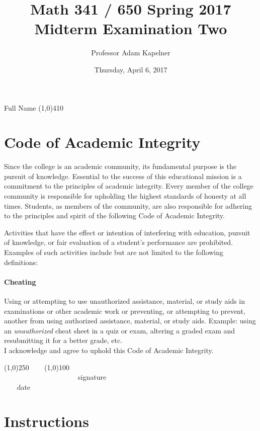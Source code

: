 \documentclass[12pt]{article}
\title{Math 341 / 650 Spring 2017 \\ Midterm Examination Two}
\author{Professor Adam Kapelner}
\date{Thursday, April 6, 2017}
\begin{document}
\maketitle

\noindent Full Name \line(1,0){410}

\thispagestyle{empty}

\section*{Code of Academic Integrity}

\footnotesize
Since the college is an academic community, its fundamental purpose is the pursuit of knowledge. Essential to the success of this educational mission is a commitment to the principles of academic integrity. Every member of the college community is responsible for upholding the highest standards of honesty at all times. Students, as members of the community, are also responsible for adhering to the principles and spirit of the following Code of Academic Integrity.

Activities that have the effect or intention of interfering with education, pursuit of knowledge, or fair evaluation of a student's performance are prohibited. Examples of such activities include but are not limited to the following definitions:

\paragraph{Cheating} Using or attempting to use unauthorized assistance, material, or study aids in examinations or other academic work or preventing, or attempting to prevent, another from using authorized assistance, material, or study aids. Example: using an \emph{unauthorized} cheat sheet in a quiz or exam, altering a graded exam and resubmitting it for a better grade, etc.
\\

\noindent I acknowledge and agree to uphold this Code of Academic Integrity. \\

\begin{center}
\line(1,0){250} ~~~ \line(1,0){100}\\
~~~~~~~~~~~~~~~~~~~~~signature~~~~~~~~~~~~~~~~~~~~~~~~~~~~~~~~~~~~~~~~~~~~~ date
\end{center}

\normalsize

\section*{Instructions}
\end{document}
